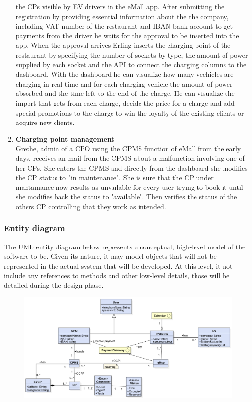 \begin{enumerate}[label=\textbf{\Alph*}.]
            the CPs visible by EV drivers in the eMall app. After submitting the registration by providing essential information about the the company, including
            VAT number of the restaurant and IBAN bank account to get payments from the driver he waits for the approval to be inserted into the app.
            When the approval arrives Erling inserts the charging point of the restaurant by specifying the number of sockets by type, the amount of power supplied by
            each socket and the API to connect the charging columns to the dashboard. With the dashboard he can visualize how many vechicles are charging in real time
            and for each charging vehicle the amount of power absorbed and the time left to the end of the charge. He can visualize the import that gets from each
            charge, decide the price for a charge and add special promotions to the charge to win the loyalty of the existing clients or acquire new clients.
      \item \textbf{Charging point management} \\
            Grethe, admin of a CPO using the CPMS function of eMall from the early days, receives an mail from the CPMS about a malfunction involving one of her CPs.
            She enters the CPMS and directly from the dashboard she modifies the CP status to "in maintenance".
            She is sure that the CP under mantainance now results as unvailable for every user trying to book it until she modifies back the status to "available".
            Then verifies the status of the others CP controlling that they work as intended.
\end{enumerate}

\subsubsection{Entity diagram}
The UML entity diagram below represents a conceptual, high-level model of
the software to be. Given its nature, it may model objects that will not
be represented in the actual system that will be developed. At this
level, it not include any references to methods and other low-level
details, those will be detailed during the design phase.
\begin{figure}[H]
      \centering
      \includegraphics[scale=0.4]{src/domain_UML.png}
\end{figure} \vspace{1cm}

